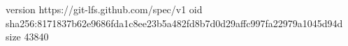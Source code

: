 version https://git-lfs.github.com/spec/v1
oid sha256:8171837b62e9686fda1c8ee23b5a482fd8b7d0d29affc997fa22979a1045d94d
size 43840
